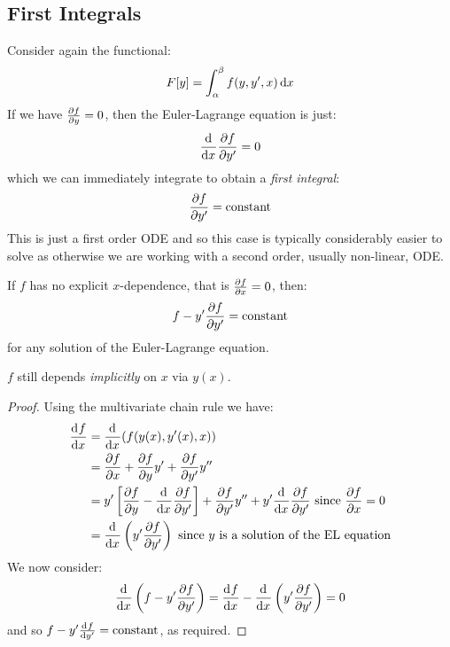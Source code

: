 \documentclass[../main.tex]{subfiles}
\begin{document}
\subsection{First Integrals}
Consider again the functional:
\[
  F[y] = \int_{\alpha}^{\beta} f(y, y', x) \d{x}
\]
If we have $\pderiv{f}{y} = 0$, then the Euler-Lagrange equation is just:
\[
  \deriv{}{x} \pderiv{f}{y'} = 0
\]
which we can immediately integrate to obtain a \textit{first integral}:
\[
  \pderiv{f}{y'} = \text{constant}
\]
This is just a first order ODE and so this case is typically considerably easier to solve as otherwise we are working with a second order, usually non-linear, ODE.
\begin{proposition}
  If $f$ has no explicit $x$-dependence, that is $\pderiv{f}{x} = 0$, then: \label{noXDep}
  \[
    f - y' \pderiv{f}{y'} = \text{constant}
  \]
  for any solution of the Euler-Lagrange equation.
\end{proposition}
\begin{remark}[Note]
  $f$ still depends \textit{implicitly} on $x$ via $y(x)$.
\end{remark}
\begin{proof}
  Using the multivariate chain rule we have:
  \begin{align*}
    \deriv{f}{x} &= \deriv{}{x}(f(y(x), y'(x), x)) \\
                 &= \pderiv{f}{x} + \pderiv{f}{y}y' + \pderiv{f}{y'} y'' \\
                 &= y'\left[\pderiv{f}{y} - \deriv{}{x}\pderiv{f}{y'}\right] + \pderiv{f}{y'}y'' + y' \deriv{}{x} \pderiv{f}{y'} \text{ since $\pderiv{f}{x} = 0$}\\
                 &= \deriv{}{x}\left(y' \pderiv{f}{y'}\right) \text{ since $y$ is a solution of the EL equation}
  \end{align*}
  We now consider:
  \[
    \deriv{}{x}\left(f - y' \pderiv{f}{y'}\right) = \deriv{f}{x} - \deriv{}{x}\left(y' \pderiv{f}{y'}\right) = 0
  \]
  and so $f - y' \deriv{f}{y'} = \text{constant}$, as required.
\end{proof}
\end{document}
